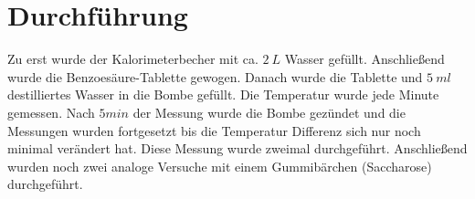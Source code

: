 \section{Durchführung}
	Zu erst wurde der Kalorimeterbecher mit ca. $2\ L$ Wasser gefüllt. 
Anschließend wurde die Benzoesäure-Tablette gewogen. 
Danach wurde die Tablette und $5\ ml$ destilliertes Wasser in die Bombe gefüllt. 
Die Temperatur wurde jede Minute gemessen. 
Nach $5 min$ der Messung wurde die Bombe gezündet und die Messungen wurden fortgesetzt bis die Temperatur Differenz sich nur noch minimal verändert hat. 
Diese Messung wurde zweimal durchgeführt. 
Anschließend wurden noch zwei analoge Versuche mit einem Gummibärchen (Saccharose) durchgeführt.
